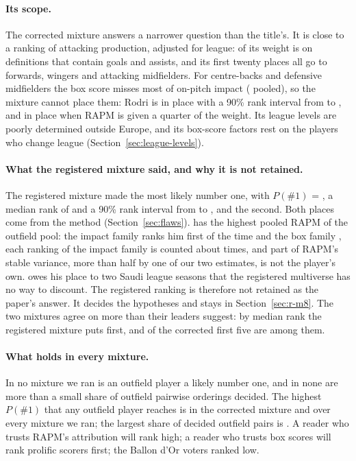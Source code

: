 \documentclass[11pt,a4paper]{article}
\begin{document}
\paragraph{Its scope.}
The corrected mixture answers a narrower question than the title's. It is
close to a ranking of attacking production, adjusted for league:
\CorrectedWeightBoxFamilies{} of its weight is on definitions that contain
goals and assists, and its first twenty places all go to forwards, wingers and
attacking midfielders. For centre-backs and defensive midfielders the box
score misses most of on-pitch impact (\ShareHigh{} pooled), so the mixture
cannot place them: Rodri is in place \CorrectedRodriPlace{} with a 90\% rank
interval from \CorrectedRodriRankLo{} to \CorrectedRodriRankHi{}, and in place
\CorrectedEqualRodriPlace{} when RAPM is given a quarter of the weight. Its
league levels are poorly determined outside Europe, and its box-score factors
rest on the players who change league (Section~\ref{sec:league-levels}).

\paragraph{What the registered mixture said, and why it is not retained.}
The registered mixture made \TopPlayerName{} the most likely number one, with
$P(\#1)$ = \TopPlayerPFirst{}, a median rank of \TopPlayerMedianRank{} and a
90\% rank interval from \TopPlayerRankLo{} to \TopPlayerRankHi{}, and
\SecondPlayerName{} the second. Both places come from the method
(Section~\ref{sec:flaws}). \TopPlayerName{} has the highest pooled RAPM of the
outfield pool: the impact family ranks him first \TopFirstImpact{} of the time
and the box family \TopFirstBox{}, each ranking of the impact family is counted
about \ImpactRepeatMean{} times, and part of RAPM's stable variance, more than
half by one of our two estimates, is not the player's own. \SecondPlayerName{} owes his place to two Saudi league seasons
that the registered multiverse has no way to discount. The registered ranking
is therefore not retained as the paper's answer. It decides the hypotheses and
stays in Section~\ref{sec:r-m8}. The two mixtures agree on more than their
leaders suggest: by median rank the registered mixture puts
\RegisteredTopFive{} first, and \CorrectedTopFiveInRegistered{} of the
corrected first five are among them.

\paragraph{What holds in every mixture.}
In no mixture we ran is an outfield player a likely number one, and in none
are more than a small share of outfield pairwise orderings decided. The
highest $P(\#1)$ that any outfield player reaches is \CorrectedTopPFirst{} in
the corrected mixture and \AllVariantsMaxPFirst{} over every mixture we ran;
the largest share of decided outfield pairs is \AllVariantsMaxDecided{}. A
reader who trusts RAPM's attribution will rank \TopPlayerName{} high; a reader
who trusts box scores will rank prolific scorers first; the Ballon d'Or voters
ranked \TopPlayerName{} low.
\end{document}
